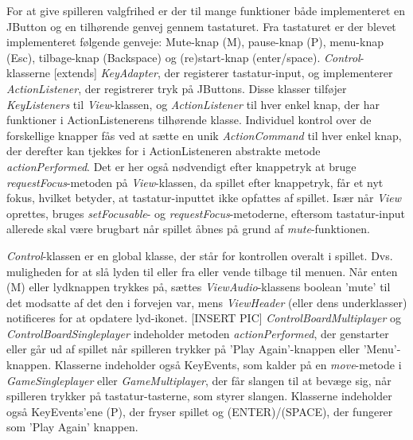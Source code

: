 For at give spilleren valgfrihed er der til mange funktioner både implementeret en JButton og en tilhørende genvej gennem tastaturet. Fra tastaturet er der blevet implementeret følgende genveje: Mute-knap (M), pause-knap (P), menu-knap (Esc), tilbage-knap (Backspace) og (re)start-knap (enter/space). \textit{Control}-klasserne [extends] \textit{KeyAdapter}, der registerer tastatur-input, og implementerer \textit{ActionListener}, der registrerer tryk på JButtons. Disse klasser tilføjer \textit{KeyListeners} til \textit{View}-klassen, og \textit{ActionListener} til hver enkel knap, der har funktioner i ActionListenerens tilhørende klasse. Individuel kontrol over de forskellige knapper fås ved at sætte en unik \textit{ActionCommand} til hver enkel knap, der derefter kan tjekkes for i ActionListeneren abstrakte metode \textit{actionPerformed}. Det er her også nødvendigt efter knappetryk at bruge \textit{requestFocus}-metoden på \textit{View}-klassen, da spillet efter knappetryk, får et nyt fokus, hvilket betyder, at tastatur-inputtet ikke opfattes af spillet.
Især når \textit{View} oprettes, bruges \textit{setFocusable}- og \textit{requestFocus}-metoderne, eftersom tastatur-input allerede skal være brugbart når spillet åbnes på grund af \textit{mute}-funktionen.

\textit{Control}-klassen er en global klasse, der står for kontrollen overalt i spillet. Dvs. muligheden for at slå lyden til eller fra eller vende tilbage til menuen. Når enten (M) eller lydknappen trykkes på, sættes \textit{ViewAudio}-klassens boolean 'mute' til det modsatte af det den i forvejen var, mens \textit{ViewHeader} (eller dens underklasser) notificeres for at opdatere lyd-ikonet. [INSERT PIC]
\textit{ControlBoardMultiplayer} og \textit{ControlBoardSingleplayer} indeholder metoden \textit{actionPerformed}, der genstarter eller går ud af spillet når spilleren trykker på 'Play Again'-knappen eller 'Menu'-knappen. Klasserne indeholder også KeyEvents, som kalder på en \textit{move}-metode i \textit{GameSingleplayer} eller \textit{GameMultiplayer}, der får slangen til at bevæge sig, når spilleren trykker på tastatur-tasterne, som styrer slangen. Klasserne indeholder også KeyEvents'ene (P), der fryser spillet og (ENTER)/(SPACE), der fungerer som 'Play Again' knappen.

